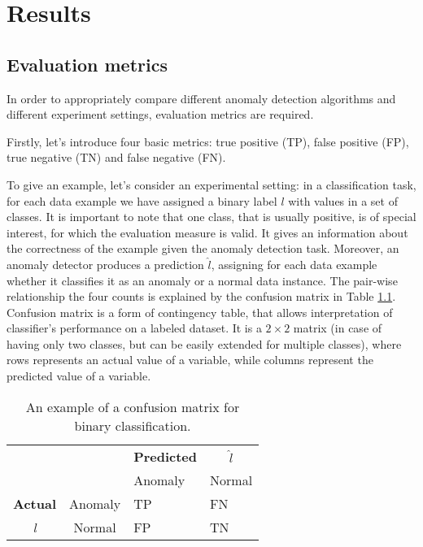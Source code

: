 \chapter{Results}

\section{Evaluation metrics}
In order to appropriately compare different anomaly detection algorithms and different experiment settings, evaluation metrics are required.

Firstly, let's introduce four basic metrics: true positive (TP), false positive (FP), true negative (TN) and false negative (FN). 

To give an example, let's consider an experimental setting: in a classification task, for each data example we have assigned a binary label $l$ with values in a set of classes. It is important to note that one class, that is usually positive, is of special interest, for which the evaluation measure is valid. It gives an information about the correctness of the example given the anomaly detection task. Moreover, an anomaly detector produces a prediction $\hat{l}$, assigning for each data example whether it classifies it as an anomaly or a normal data instance. The pair-wise relationship the four counts is explained by the confusion matrix in Table \ref{table:confusionMatrix}. Confusion matrix is a form of contingency table, that allows interpretation of classifier's performance on a labeled dataset. It is a $2 \times 2$ matrix (in case of having only two classes, but can be easily extended for multiple classes), where rows represents an actual value of a variable, while columns represent the predicted value of a variable.

\begin{table}[!h]
\centering
\begin{tabular}{cccc}
\multicolumn{1}{r}{}                 &                              & \textbf{Predicted}          &   $\hat{l}$                          \\ \cline{3-4} 
                                     & \multicolumn{1}{l|}{}        & \multicolumn{1}{l|}{Anomaly} & \multicolumn{1}{l|}{Normal} \\ \cline{2-4} 
                                      
\multicolumn{1}{l|}{\textbf{Actual}} & \multicolumn{1}{l|}{Anomaly}  & \multicolumn{1}{l|}{\textcolor{customGreen}{TP}}     & \multicolumn{1}{l|}{\textcolor{customRed}{FN}}      \\ \cline{2-4} 
\multicolumn{1}{c|}{\textit{l}}                & \multicolumn{1}{c|}{Normal} & \multicolumn{1}{l|}{\textcolor{customRed}{FP}}     & \multicolumn{1}{l|}{\textcolor{customGreen}{TN}}      \\ \cline{2-4} 
\end{tabular}
\caption{An example of a confusion matrix for binary classification.}
\label{table:confusionMatrix}
\end{table}
 
